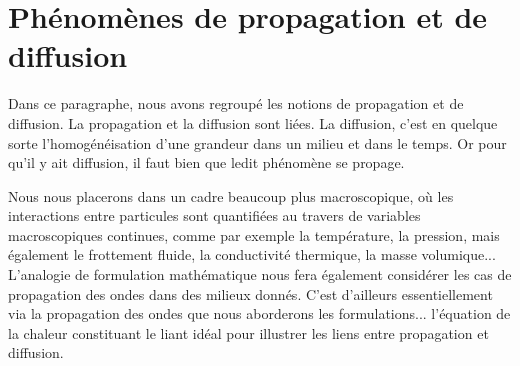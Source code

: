 \medskip
\section{Phénomènes de propagation et de diffusion}

Dans ce paragraphe, nous avons regroupé les notions de propagation et de diffusion.
\medskipvm
La propagation et la diffusion sont liées. La diffusion, c'est en quelque sorte l'homogénéisation d'une grandeur dans un milieu et dans le temps. Or pour qu'il y ait diffusion, il faut bien que ledit phénomène se propage.

\medskip
Nous nous placerons dans un cadre beaucoup plus macroscopique, où les interactions entre particules sont quantifiées au travers de variables macroscopiques continues, comme par exemple la température, la pression, mais également le frottement fluide, la conductivité thermique, la masse volumique...
\medskipvm
L'analogie de formulation mathématique nous fera également considérer les cas de propagation des ondes dans des milieux donnés. C'est d'ailleurs essentiellement via la propagation des ondes que nous aborderons les formulations... l'équation de la chaleur constituant le liant idéal pour illustrer les liens entre propagation et diffusion.

